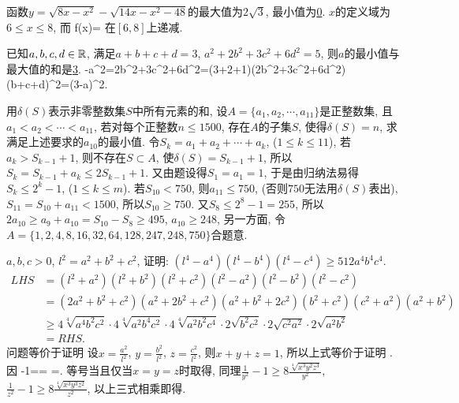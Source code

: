 \bq{}{}
函数$y=\sqrt{8x-x^2}-\sqrt{14x-x^2-48}$的最大值为\underline{$2\sqrt{3}$}, 最小值为\underline{0}.
\eq
\ba
$x$的定义域为$6\le x \le 8$, 而
\bee
f(x)=
\eee
在$[6,8]$上递减.
\ea

\bq{}{}
已知$a,b,c,d\in\mathbb{R}$, 满足$a+b+c+d=3$, $a^2+2b^2+3c^2+6d^2=5$, 
则$a$的最小值与最大值的和是\underline{3}.
\eq
\ba
{}-a^2=2b^2+3c^2+6d^2=(3+2+1)(2b^2+3c^2+6d^2)\ge(b+c+d)^2=(3-a)^2.
\eee
\ea

\bq{}{}
用$\delta(S)$表示非零整数集$S$中所有元素的和, 设$A=\{a_1,a_2,\cdots,a_{11}\}$是正整数集,
且$a_1<a_2<\cdots<a_{11}$, 若对每个正整数$n\le1500$, 存在$A$的子集$S$, 使得$\delta(S)=n$,
求满足上述要求的$a_{10}$的最小值.
\eq
\ba
令$S_k=a_1+a_2+\cdots+a_k$, ($1\le k\le 11$), 若$a_k>S_{k-1}+1$,
则不存在$S\subset A$, 使$\delta(S)=S_{k-1}+1$, 所以$S_k=S_{k-1}+a_k\le2S_{k-1}+1$.
又由题设得$S_1=a_1=1$, 于是由归纳法易得$S_k\le2^k-1$, ($1\le k\le m$).
若$S_{10}<750$, 则$a_{11}\le750$, (否则$750$无法用$\delta(S)$表出),
$S_{11}=S_{10}+a_{11}<1500$, 所以$S_{10}\ge750$.
又$S_{8}\le2^8-1=255$, 所以$2a_{10}\ge a_{9}+a_{10}=S_{10}-S_8\ge495$,
$a_{10}\ge248$, 另一方面, 令$A=\{1,2,4,8,16,32,64,128,247,248,750\}$合题意.
\ea

\bq{}{}
$a,b,c>0$, $l^2=a^2+b^2+c^2$, 证明: $(l^4-a^4)(l^4-b^4)(l^4-c^4)\ge512a^4b^4c^4$.
\eq
\ba
\begin{align*}
 LHS & = (l^2+a^2)(l^2+b^2)(l^2+c^2)(l^2-a^2)(l^2-b^2)(l^2-c^2)\\
  &=(2a^2+b^2+c^2)(a^2+2b^2+c^2)(a^2+b^2+2c^2)(b^2+c^2)(c^2+a^2)(a^2+b^2)\\
  &\ge 4\sqrt[4]{a^4b^2c^2}\cdot4\sqrt[4]{a^2b^4c^2}\cdot4\sqrt[4]{a^2b^2c^4}\cdot2\sqrt{b^2c^2}\cdot2\sqrt{c^2a^2}\cdot2\sqrt{a^2b^2}\\
  &=RHS.
\end{align*}
\ea
\ba
问题等价于证明
\bee
{}
\eee
设$x=\frac{a^2}{l^2}$, $y=\frac{b^2}{l^2}$, $z=\frac{c^2}{l^2}$, 则$x+y+z=1$, 所以上式等价于证明
\bee
{}.
\eee
因
\bee
{}-1==
  \ge{}
  \ge{}
  =.
\eee
等号当且仅当$x=y=z$时取得, 同理$\frac1{y^2}-1\ge8\frac{\sqrt[4]{x^3y^2z^3}}{y^2}$, 
$\frac{1}{z^2}-1\ge8\frac{\sqrt[4]{x^3y^3z^2}}{z^2}$, 以上三式相乘即得.
\ea


